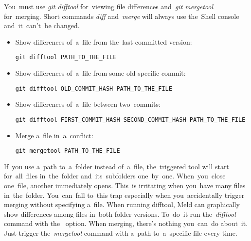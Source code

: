 You~must use \textit{git difftool} for~viewing file differences and~\textit{git mergetool} for~merging.
Short commands \textit{diff} and~\textit{merge} will always use the~Shell console and~it~can't~be changed.

\begin{itemize}
    \item Show differences of~a~file from the~last committed version:
\begin{lstlisting}[frame=no, gobble=12]
            git difftool PATH_TO_THE_FILE
        \end{lstlisting}
    \item Show differences of~a~file from some old specific commit:
\begin{lstlisting}[frame=no, gobble=12]
            git difftool OLD_COMMIT_HASH PATH_TO_THE_FILE
        \end{lstlisting}
    \item Show differences of~a~file between two~commits:
\begin{lstlisting}[frame=no, gobble=12]
            git difftool FIRST_COMMIT_HASH SECOND_COMMIT_HASH PATH_TO_THE_FILE
        \end{lstlisting}
    \item Merge a~file in~a~conflict:
\begin{lstlisting}[frame=no, gobble=12]
            git mergetool PATH_TO_THE_FILE
        \end{lstlisting}
\end{itemize}

\warningnonl If~you use a~path to~a~folder instead of~a~file, the~triggered tool will start for~all~files in~the~folder and~its~subfolders one~by~one.
When~you~close one~file, another immediately opens.
This~is irritating when you~have many files in~the~folder.
You~can~fall to~this trap especially when you~accidentally trigger merging without specifying a~file.
When running difftool, Meld can graphically show differences among files in~both folder versions.
To~do~it run the~\textit{difftool} command with the~ option.
When merging, there's nothing you~can~do about~it.
Just trigger the~\textit{mergetool} command with a~path to~a~specific file every time.

